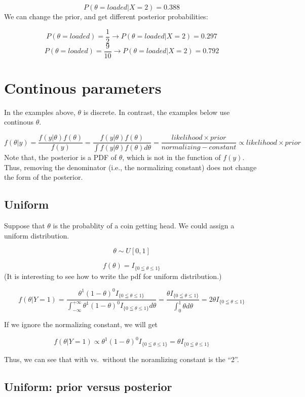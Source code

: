\documentclass[]{book}
\begin{document}
\[P(\theta=loaded | X=2)=0.388\] We can change the prior, and get
different posterior probabilities:

\[P(\theta=loaded)=\frac{1}{2} \rightarrow P(\theta=loaded | X=2)=0.297\]
\[P(\theta=loaded)=\frac{9}{10} \rightarrow P(\theta=loaded | X=2)=0.792\]

\section{Continous parameters}\label{continous-parameters}

In the examples above, \(\theta\) is discrete. In contrast, the examples
below use continous \(\theta\).

\[f(\theta |y)=\frac{f(y|\theta) f(\theta)}{f(y)}=\frac{f(y|\theta) f(\theta)}{\int f(y|\theta)f(\theta)d\theta}=\frac{likelihood \times prior}{normalizing-constant} \propto likelihood \times prior\]
Note that, the posterior is a PDF of \(\theta\), which is not in the
function of \(f(y)\). Thus, removing the denominator (i.e., the
normalizing constant) does not change the form of the posterior.

\subsection{Uniform}\label{uniform}

Suppose that \(\theta\) is the probablity of a coin getting head. We
could assign a uniform distribution.

\[\theta \sim U[0,1]\]

\[f(\theta)=I_{ \{0 \leqq \theta \leqslant 1 \}}\] (It is interesting to
see how to write the pdf for uniform distribution.)

\[f(\theta | Y=1)= \frac{\theta^1(1-\theta)^0 I_{\{0 \leqq \theta \leqslant 1\}}}{\int_{-\infty}^{+\infty} \theta^1(1-\theta)^0 I_{\{0 \leqq \theta \leqslant 1\}} d\theta}=\frac{\theta I_{\{0 \leqq \theta \leqslant 1 \}}}{\int_0^1 \theta d\theta}=2\theta I_{ \{0 \leqq \theta \leqslant 1\}}\]

If we ignore the normalizing constant, we will get

\[f(\theta | Y=1) \propto \theta^1(1-\theta)^0 I_{ \{0 \leqq \theta \leqslant 1\} }=\theta I_{ \{0 \leqq \theta \leqslant 1\} }\]

Thus, we can see that with vs.~without the noramlizing constant is the
``2''.

\subsection{Uniform: prior versus
posterior}\label{uniform-prior-versus-posterior}
\end{document}
